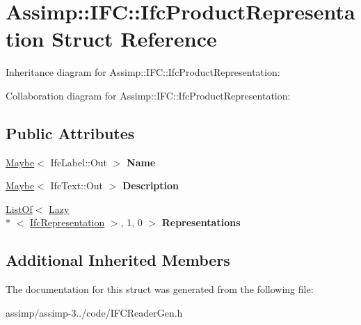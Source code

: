 \hypertarget{struct_assimp_1_1_i_f_c_1_1_ifc_product_representation}{\section{Assimp\+:\+:I\+F\+C\+:\+:Ifc\+Product\+Representation Struct Reference}
\label{struct_assimp_1_1_i_f_c_1_1_ifc_product_representation}
}


Inheritance diagram for Assimp\+:\+:I\+F\+C\+:\+:Ifc\+Product\+Representation\+:


Collaboration diagram for Assimp\+:\+:I\+F\+C\+:\+:Ifc\+Product\+Representation\+:
\subsection*{Public Attributes}
\begin{DoxyCompactItemize}
\item 
\hypertarget{struct_assimp_1_1_i_f_c_1_1_ifc_product_representation_a0b0c4a2e4fb09f3fb52bf6c743ac5f13}{\hyperlink{struct_assimp_1_1_s_t_e_p_1_1_maybe}{Maybe}$<$ Ifc\+Label\+::\+Out $>$ {\bfseries Name}}\label{struct_assimp_1_1_i_f_c_1_1_ifc_product_representation_a0b0c4a2e4fb09f3fb52bf6c743ac5f13}

\item 
\hypertarget{struct_assimp_1_1_i_f_c_1_1_ifc_product_representation_a77f86bf49b4e9a519b923881ab198a55}{\hyperlink{struct_assimp_1_1_s_t_e_p_1_1_maybe}{Maybe}$<$ Ifc\+Text\+::\+Out $>$ {\bfseries Description}}\label{struct_assimp_1_1_i_f_c_1_1_ifc_product_representation_a77f86bf49b4e9a519b923881ab198a55}

\item 
\hypertarget{struct_assimp_1_1_i_f_c_1_1_ifc_product_representation_a767d72319acaf50c3fdf537196766547}{\hyperlink{struct_assimp_1_1_s_t_e_p_1_1_list_of}{List\+Of}$<$ \hyperlink{struct_assimp_1_1_s_t_e_p_1_1_lazy}{Lazy}\\*
$<$ \hyperlink{struct_assimp_1_1_i_f_c_1_1_ifc_representation}{Ifc\+Representation} $>$, 1, 0 $>$ {\bfseries Representations}}\label{struct_assimp_1_1_i_f_c_1_1_ifc_product_representation_a767d72319acaf50c3fdf537196766547}

\end{DoxyCompactItemize}
\subsection*{Additional Inherited Members}


The documentation for this struct was generated from the following file\+:\begin{DoxyCompactItemize}
\item 
assimp/assimp-\/3../code/I\+F\+C\+Reader\+Gen.\+h\end{DoxyCompactItemize}

